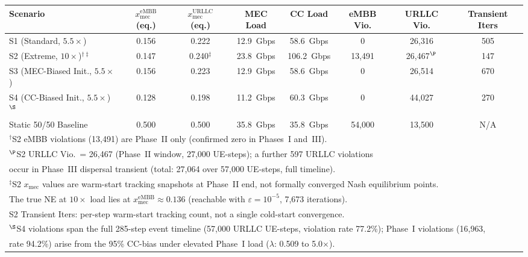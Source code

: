 \documentclass[conference]{IEEEtran}
\begin{document}
\begin{table}[t]
\begin{tabular}{lccccccc}
\toprule
\textbf{Scenario} &
  \textbf{$x_\text{mec}^\text{eMBB}$ (eq.)} &
  \textbf{$x_\text{mec}^\text{URLLC}$ (eq.)} &
  \textbf{MEC Load} &
  \textbf{CC Load} &
  \textbf{eMBB Vio.} &
  \textbf{URLLC Vio.} &
  \textbf{Transient Iters} \\
\midrule
S1 (Standard, $5.5\times$)
  & 0.156 & 0.222 & 12.9~Gbps & 58.6~Gbps & 0 & 26{,}316 & 505 \\
S2 (Extreme, $10\times$)$^{\dagger\ddagger}$
  & 0.147 & 0.240$^\ddagger$ & 23.8~Gbps & 106.2~Gbps & 13{,}491 & 26{,}467$^\P$ & 147 \\
S3 (MEC-Biased Init., $5.5\times$)
  & 0.156 & 0.223 & 12.9~Gbps & 58.6~Gbps & 0 & 26{,}514 & 670 \\
S4 (CC-Biased Init., $5.5\times$)$^\S$
  & 0.128 & 0.198 & 11.2~Gbps & 60.3~Gbps & 0 & 44{,}027 & 270 \\
\midrule
Static 50/50 Baseline
  & 0.500 & 0.500 & 35.8~Gbps & 35.8~Gbps & 54{,}000 & 13{,}500 & N/A \\
\bottomrule
\multicolumn{8}{l}{\footnotesize $^\dagger$S2 eMBB violations (13,491) are Phase~II only (confirmed zero in Phases~I and~III).}\\
\multicolumn{8}{l}{\footnotesize $^\P$S2 URLLC Vio.\ = 26,467 (Phase~II window, 27,000 UE-steps); a further 597 URLLC violations}\\
\multicolumn{8}{l}{\footnotesize \phantom{$^\P$}occur in Phase~III dispersal transient (total: 27,064 over 57,000 UE-steps, full timeline).}\\
\multicolumn{8}{l}{\footnotesize $^\ddagger$S2 $x_\text{mec}$ values are warm-start
  tracking snapshots at Phase~II end, not formally converged Nash equilibrium points.}\\
\multicolumn{8}{l}{\footnotesize \phantom{$^\ddagger$}The true NE at $10\times$ load lies at $x_\text{mec}^\text{eMBB} \approx 0.136$
  (reachable with $\varepsilon = 10^{-5}$, 7,673 iterations).}\\
\multicolumn{8}{l}{\footnotesize \phantom{$^\dagger$}S2 Transient Iters: per-step
  warm-start tracking count, not a single cold-start convergence.}\\
\multicolumn{8}{l}{\footnotesize $^\S$S4 violations span the full 285-step event
  timeline (57,000 URLLC UE-steps, violation rate 77.2\%); Phase~I violations (16,963,}\\
\multicolumn{8}{l}{\footnotesize \phantom{$^\S$}rate 94.2\%) arise from the 95\% CC-bias under elevated Phase~I load ($\lambda$: 0.509 to 5.0$\times$).}\\
\end{tabular}
\end{table}
\end{document}
